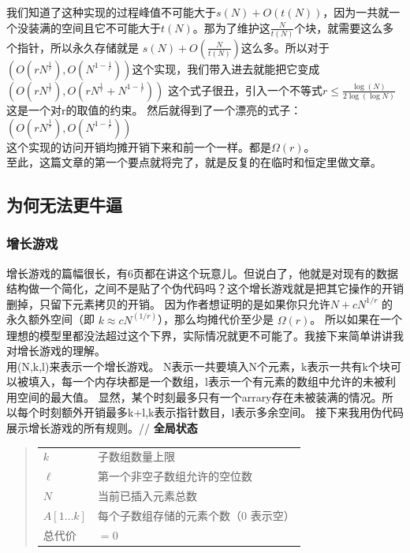 \documentclass[12pt,a4paper]{article}
\begin{document}
我们知道了这种实现的过程峰值不可能大于$s(N)+O(t(N))$，因为一共就一个没装满的空间且它不可能大于$t(N)$。那为了维护这$\frac{N}{t(N)}$个块，就需要这么多个指针，所以永久存储就是
$s(N)+O(\frac{N}{t(N)})$这么多。所以对于
$(O(rN^{\frac{1}{r}}),O(N^{1-\frac{1}{r}}))$这个实现，我们带入进去就能把它变成$(O(rN^{\frac{1}{r}}),O(rN^{\frac{1}{r}}+N^{1-\frac{1}{r}}))$
这个式子很丑，引入一个不等式$r\le \frac{\log (N)}{2\log( \log N) }$这是一个对r的取值的约束。
然后就得到了一个漂亮的式子：$(O(rN^{\frac{1}{r}}),O(N^{1-\frac{1}{r}}))$\\
这个实现的访问开销均摊开销下来和前一个一样。都是$\Omega(r)$。\\
至此，这篇文章的第一个要点就将完了，就是反复的在临时和恒定里做文章。\\
\subsection{为何无法更牛逼}

\subsubsection{增长游戏}
增长游戏的篇幅很长，有6页都在讲这个玩意儿。但说白了，他就是对现有的数据结构做一个简化，之间不是贴了个伪代码吗？这个增长游戏就是把其它操作的开销删掉，只留下元素拷贝的开销。
因为作者想证明的是如果你只允许$ N + cN^{1/r}$ 的永久额外空间（即 $k ≈ cN^(1/r)$），那么均摊代价至少是 $\Omega(r)$。
所以如果在一个理想的模型里都没法超过这个下界，实际情况就更不可能了。我接下来简单讲讲我对增长游戏的理解。\\
用(N,k,l)来表示一个增长游戏。
N表示一共要填入N个元素，k表示一共有k个块可以被填入，每一个内存块都是一个数组，l表示一个有元素的数组中允许的未被利用空间的最大值。
显然，某个时刻最多只有一个arrary存在未被装满的情况。所以每个时刻额外开销最多k+l,k表示指针数目，l表示多余空间。
接下来我用伪代码展示增长游戏的所有规则。//
\textbf{全局状态}
\begin{quote}
\begin{tabular}{@{}ll@{}}
$k$          & 子数组数量上限 \\
$\ell$       & 第一个非空子数组允许的空位数 \\
$N$          & 当前已插入元素总数 \\
$A[1\ldots k]$ & 每个子数组存储的元素个数（$0$ 表示空） \\
总代价       & $= 0$
\end{tabular}
\end{quote}
\end{document}
